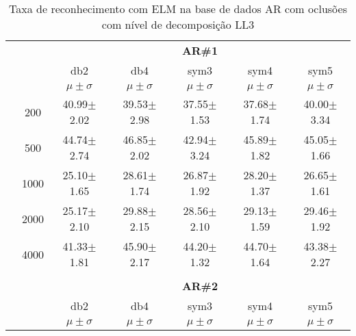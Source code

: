 \begin{table}[H]
	\centering
    \normalsize
	\caption{Taxa de reconhecimento com ELM na base de dados AR com oclusões com nível de decomposição LL3}
    \label{tab:reconhecimento_AR_com_oclusoes}
	\begin{tabular}{|c|c|c c c c c|}
\cline{3-7}
\multicolumn{2}{c|}{\multirow{3}{*}{}} & \multicolumn{5}{c|}{\textbf{AR\#1}}   \\\cline{3-7} 
\multicolumn{2}{c|}{}  & db2 & db4 & sym3 & sym4 & sym5 \\\cline{3-7}%
\multicolumn{2}{c|}{}& $\mu \pm \sigma$ & $\mu \pm \sigma$ & $\mu \pm \sigma$ & $\mu \pm \sigma$ & $\mu \pm \sigma$ \\\hline


\multicolumn{1}{|c|}{ \multirow{5}{*}{\rotatebox[origin=c]{90}{\textbf{Neurônios}}} }
& 200		&40.99$\pm$2.02	&39.53$\pm$2.98	&37.55$\pm$1.53		&37.68$\pm$1.74	&40.00$\pm$3.34 \\\cline{2-7}%
& 500		&44.74$\pm$2.74	& 46.85$\pm$2.02&42.94$\pm$3.24		&45.89$\pm$1.82	&45.05$\pm$1.66 \\\cline{2-7}%

& 1000		&25.10$\pm$1.65	&28.61$\pm$1.74	&26.87$\pm$1.92		&28.20$\pm$1.37	&26.65$\pm$1.61 \\\cline{2-7}%

& 2000		&25.17$\pm$2.10	&29.88$\pm$2.15	&28.56$\pm$2.10		&29.13$\pm$1.59	&29.46$\pm$1.92 \\\cline{2-7}%

& 4000		&41.33$\pm$1.81	&45.90$\pm$2.17	&44.20$\pm$1.32		&44.70$\pm$1.64	&43.38$\pm$2.27 \\\midrule%

\multicolumn{7}{c}{}\\ 

\cline{3-7}
\multicolumn{2}{c|}{\multirow{3}{*}{}} & \multicolumn{5}{c|}{\textbf{AR\#2}}   \\\cline{3-7} 

\multicolumn{2}{c|}{}  & db2 & db4 & sym3 & sym4 & sym5 \\\cline{3-7}
\multicolumn{2}{c|}{}& $\mu \pm \sigma$ & $\mu \pm \sigma$ & $\mu \pm \sigma$ & $\mu \pm \sigma$ & $\mu \pm \sigma$ \\\hline



\end{tabular}
\end{table}
